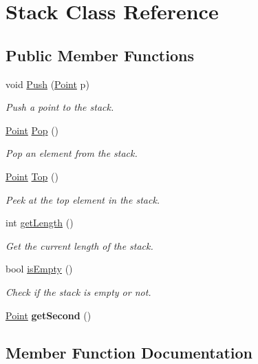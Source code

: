 \hypertarget{classStack}{}\section{Stack Class Reference}
\label{classStack}
\subsection*{Public Member Functions}
\begin{DoxyCompactItemize}
\item 
void \hyperlink{classStack_a384072a832799839cfdb898f08155e26}{Push} (\hyperlink{classPoint}{Point} p)
\begin{DoxyCompactList}\small\item\em Push a point to the stack. \end{DoxyCompactList}\item 
\hyperlink{classPoint}{Point} \hyperlink{classStack_acf31e26723c54767d07ec477b1afa83a}{Pop} ()
\begin{DoxyCompactList}\small\item\em Pop an element from the stack. \end{DoxyCompactList}\item 
\hyperlink{classPoint}{Point} \hyperlink{classStack_afc15a70c319136075268f08baffb75a6}{Top} ()
\begin{DoxyCompactList}\small\item\em Peek at the top element in the stack. \end{DoxyCompactList}\item 
int \hyperlink{classStack_a605779c5d478b2b5b7e50b83f9130d84}{get\+Length} ()
\begin{DoxyCompactList}\small\item\em Get the current length of the stack. \end{DoxyCompactList}\item 
bool \hyperlink{classStack_acfd33dabc532e2706dea1699a4de2636}{is\+Empty} ()
\begin{DoxyCompactList}\small\item\em Check if the stack is empty or not. \end{DoxyCompactList}\item 
\mbox{\label{classStack_a467a352b653ec669e9dd984e886e74b9}} 
\hyperlink{classPoint}{Point} {\bfseries get\+Second} ()
\end{DoxyCompactItemize}


\subsection{Member Function Documentation}
\mbox{\label{classStack_a605779c5d478b2b5b7e50b83f9130d84}} 
